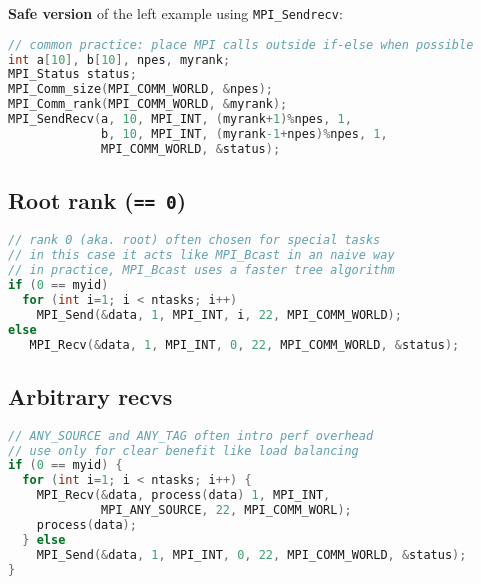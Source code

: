 \textbf{Safe version} of the left example using \texttt{MPI\_Sendrecv}:
\begin{lstlisting}[language=C,]
// common practice: place MPI calls outside if-else when possible
int a[10], b[10], npes, myrank;
MPI_Status status;
MPI_Comm_size(MPI_COMM_WORLD, &npes);
MPI_Comm_rank(MPI_COMM_WORLD, &myrank);
MPI_SendRecv(a, 10, MPI_INT, (myrank+1)%npes, 1,
             b, 10, MPI_INT, (myrank-1+npes)%npes, 1,
             MPI_COMM_WORLD, &status);
\end{lstlisting}

\subsection*{Root rank (\texttt{== 0})}
\begin{lstlisting}[language=C]
// rank 0 (aka. root) often chosen for special tasks
// in this case it acts like MPI_Bcast in an naive way
// in practice, MPI_Bcast uses a faster tree algorithm
if (0 == myid)
  for (int i=1; i < ntasks; i++)
    MPI_Send(&data, 1, MPI_INT, i, 22, MPI_COMM_WORLD);
else
   MPI_Recv(&data, 1, MPI_INT, 0, 22, MPI_COMM_WORLD, &status);
\end{lstlisting}
\subsection*{Arbitrary recvs}
\begin{lstlisting}[language=C]
// ANY_SOURCE and ANY_TAG often intro perf overhead
// use only for clear benefit like load balancing
if (0 == myid) {
  for (int i=1; i < ntasks; i++) {
    MPI_Recv(&data, process(data) 1, MPI_INT,
             MPI_ANY_SOURCE, 22, MPI_COMM_WORL);
    process(data);
  } else
    MPI_Send(&data, 1, MPI_INT, 0, 22, MPI_COMM_WORLD, &status);
}
\end{lstlisting}
